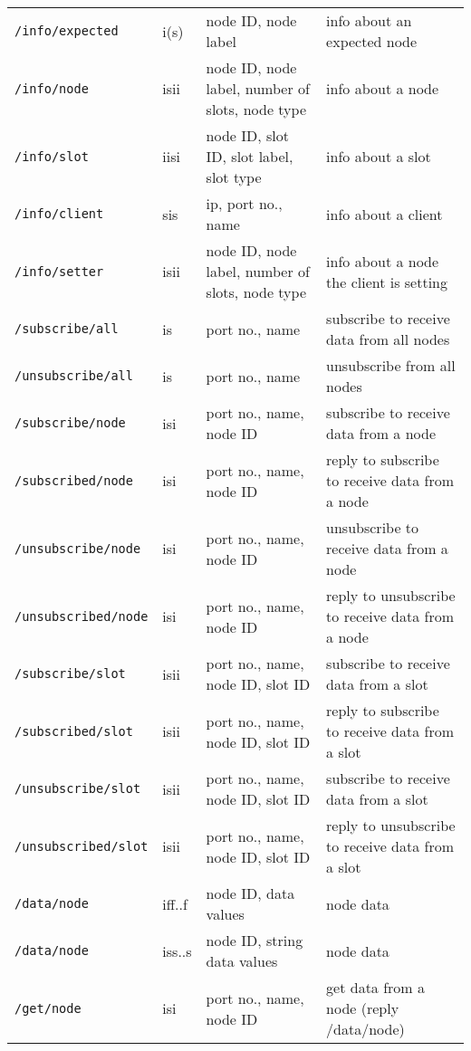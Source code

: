 \documentclass[letterpaper,10pt]{article}
\begin{document}
\begin{sidewaystable}[!tbp]
\begin{center}
\begin{tabular}{|llll|}
\verb|/info/expected| & i(s) & node ID, node label & info about an expected node \\
\verb|/info/node| & isii & node ID, node label, number of slots, node type & info about a node \\
\verb|/info/slot| & iisi & node ID, slot ID, slot label, slot type & info about a slot \\
\verb|/info/client| & sis & ip, port no., name & info about a client \\
\verb|/info/setter| & isii & node ID, node label, number of slots, node type & info about a node the client is setting \\

\verb|/subscribe/all| & is & port no., name & subscribe to receive data from all nodes \\
\verb|/unsubscribe/all| & is & port no., name & unsubscribe from all nodes \\

\verb|/subscribe/node| & isi & port no., name, node ID & subscribe to receive data from a node \\
\verb|/subscribed/node| & isi & port no., name, node ID & reply to subscribe to receive data from a node \\

\verb|/unsubscribe/node| & isi & port no., name, node ID & unsubscribe to receive data from a node \\
\verb|/unsubscribed/node| & isi & port no., name, node ID & reply to unsubscribe to receive data from a node \\

\verb|/subscribe/slot| & isii & port no., name, node ID, slot ID & subscribe to receive data from a slot \\  
\verb|/subscribed/slot| & isii & port no., name, node ID, slot ID & reply to subscribe to receive data from a slot \\  

\verb|/unsubscribe/slot| & isii & port no., name, node ID, slot ID & subscribe to receive data from a slot \\  
\verb|/unsubscribed/slot| & isii & port no., name, node ID, slot ID & reply to unsubscribe to receive data from a slot \\  

\verb|/data/node| & iff..f & node ID, data values & node data \\
\verb|/data/node| & iss..s & node ID, string data values & node data \\
\verb|/get/node| & isi & port no., name, node ID & get data from a node (reply /data/node) \\


\end{tabular}
\end{center}
\end{sidewaystable}
\end{document}

